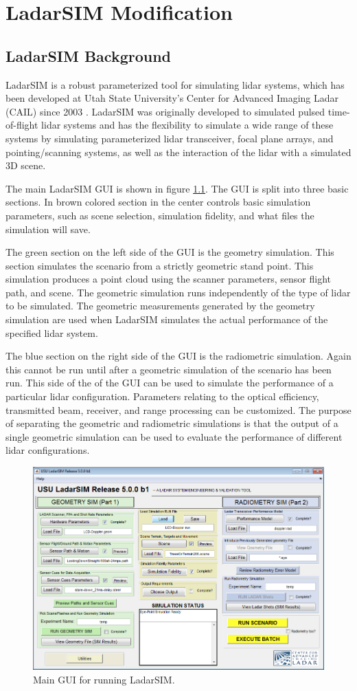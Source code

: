 \chapter{LadarSIM Modification}

\section{LadarSIM Background}

LadarSIM is a robust parameterized tool for simulating lidar systems, which has been
developed at Utah State University's Center for Advanced Imaging Ladar (CAIL) since 2003
\cite{budgeLeishman,neilsenBudge}. LadarSIM was originally developed to simulated pulsed 
time-of-flight lidar systems and has the flexibility to simulate
a wide range of these systems by simulating parameterized lidar transceiver, focal plane 
arrays, and pointing/scanning systems, as well as the interaction of the lidar with a 
simulated 3D scene. 

The main LadarSIM GUI is shown in figure \ref{fig:LadarSIM}. The GUI is split into three basic 
sections. In brown colored section in the center controls basic simulation parameters, such as
scene selection, simulation fidelity, and what files the simulation will save. 

The green section on the left side of the GUI is the geometry simulation. This section simulates
the scenario from a strictly geometric stand point. This simulation produces a point cloud using 
the scanner parameters, sensor flight path, and scene. The geometric simulation runs independently
of the type of lidar to be simulated. The geometric measurements generated by the geometry simulation
are used when LadarSIM simulates the actual performance of the specified lidar system. 

The blue section on the right side of the GUI is the radiometric simulation. Again this cannot be run
until after a geometric simulation of the scenario has been run. This side of the of the GUI can be used
to simulate the performance of a particular lidar configuration. Parameters relating to the optical efficiency, 
transmitted beam, receiver, and range processing can be customized. The purpose of separating the geometric 
and radiometric simulations is that the output of a single geometric simulation can be used to evaluate the 
performance of different lidar configurations. 

\begin{figure}[!htb]
	\centering
	\includegraphics[width=.8\columnwidth]{figs/LadarSIM}
	\vspace{1em}
	\caption{Main GUI for running LadarSIM.}
	\label{fig:LadarSIM}
\end{figure}
